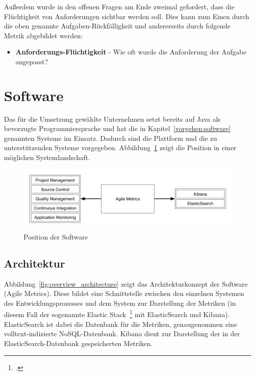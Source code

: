 Außerdem wurde in den offenen Fragen am Ende zweimal gefordert, dass die Flüchtigkeit von Anforderungen sichtbar werden soll. 
Dies kann zum Einen durch die oben genannte Aufgaben-Rückfälligkeit und andererseits durch folgende Metrik abgebildet werden:

\begin{itemize}[noitemsep]
    \item \textbf{Anforderungs-Flüchtigkeit} \mbox{-} Wie oft wurde die Anforderung der Aufgabe angepasst?
\end{itemize}

\newpage
\section{Software}

Das für die Umsetzung gewählte Unternehmen setzt bereits auf Java als bevorzugte Programmiersprache und hat die in Kapitel~\ref{vorgehen:software} genannten Systeme im Einsatz.
Dadurch sind die Plattform und die zu unterstützenden Systeme vorgegeben.
Abbildung~\ref{fig:position_software} zeigt die Position in einer möglichen Systemlandschaft.

\begin{savenotes}
    \begin{figure}[H] 
        \centering
            \includegraphics[width=1.0\textwidth]{img/position-overview.png}
        \caption{Position der Software}\label{fig:position_software}
    \end{figure}
\end{savenotes}

\subsection{Architektur}

Abbildung~\ref{fig:overview_architecture} zeigt das Architekturkonzept der Software (Agile Metrics).
Diese bildet eine Schnittstelle zwischen den einzelnen Systemen des Entwicklungsprozesses und dem System zur Darstellung der Metriken (in diesem Fall der sogenannte Elastic Stack~\footcite{elastic_stack} mit ElasticSearch und Kibana).
ElasticSearch ist dabei die Datenbank für die Metriken, genaugenommen eine volltext-indizierte \ac{NoSQL}-Datenbank.
Kibana dient zur Darstellung der in der ElasticSearch-Datenbank gespeicherten Metriken.

